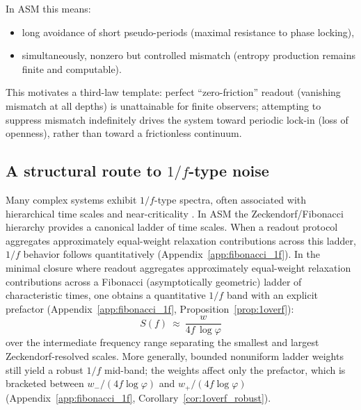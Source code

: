 In ASM this means:
\begin{itemize}
  \item long avoidance of short pseudo-periods (maximal resistance to phase locking),
  \item simultaneously, nonzero but controlled mismatch (entropy production remains finite and computable).
\end{itemize}
This motivates a third-law template: perfect ``zero-friction'' readout (vanishing mismatch at all depths) is unattainable for finite observers; attempting to suppress mismatch indefinitely drives the system toward periodic lock-in (loss of openness), rather than toward a frictionless continuum.

\subsection{A structural route to \texorpdfstring{$1/f$}{1/f}-type noise}

Many complex systems exhibit $1/f$-type spectra, often associated with hierarchical time scales and near-criticality \cite{DuttaHorn1981,Weissman1988}. In ASM the Zeckendorf/Fibonacci hierarchy provides a canonical ladder of time scales. When a readout protocol aggregates approximately equal-weight relaxation contributions across this ladder, $1/f$ behavior follows quantitatively (Appendix~\ref{app:fibonacci_1f}).
\noindent In the minimal closure where readout aggregates approximately equal-weight relaxation contributions across a Fibonacci (asymptotically geometric) ladder of characteristic times, one obtains a quantitative $1/f$ band with an explicit prefactor (Appendix~\ref{app:fibonacci_1f}, Proposition~\ref{prop:1overf}):
\begin{equation}
  S(f)\ \approx\ \frac{w}{4 f\,\log\varphi}
\end{equation}
over the intermediate frequency range separating the smallest and largest Zeckendorf-resolved scales.
More generally, bounded nonuniform ladder weights still yield a robust $1/f$ mid-band; the weights affect only the prefactor, which is bracketed between $w_-/(4 f\log\varphi)$ and $w_+/(4 f\log\varphi)$ (Appendix~\ref{app:fibonacci_1f}, Corollary~\ref{cor:1overf_robust}).


